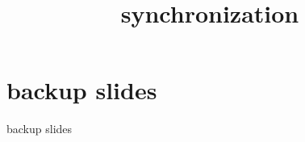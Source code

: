 \graphicspath{{./figures/}}
\title{synchronization}
\date{}

\begin{frame}
    \titlepage
\end{frame}






\section{backup slides}
\begin{frame}{backup slides}
\end{frame}




